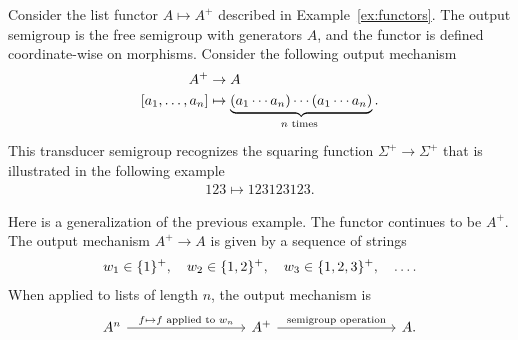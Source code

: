 \begin{myexample}\label{ex:squaring}
    Consider the list functor $A \mapsto A^+$ described in Example~\ref{ex:functors}. The output semigroup is the free semigroup with generators $A$, and the functor is defined coordinate-wise on morphisms. Consider the following output mechanism 
    \begin{align*}
    A^+ & \to A\\
    [a_1,\ldots,a_n] & \mapsto \myunderbrace{(a_1 \cdots a_n) \cdots (a_1 \cdots a_n)}{$n$ times}.
    \end{align*}
    This transducer semigroup recognizes the squaring function $\Sigma^+ \to \Sigma^+$ that is illustrated in the following example 
    \begin{align*}
    123 \mapsto 123123123.
    \end{align*}
\end{myexample}

\begin{myexample}\label{ex:squaring-generalized}
    Here is a generalization of the previous example. The functor continues to be $A^+$. The output mechanism $A^+ \to A$ is given by a sequence of strings 
    \begin{align*}
    w_1 \in \{1\}^+, \quad w_2 \in \{1,2\}^+, \quad w_3 \in \{1,2,3\}^+, \quad \ldots.
    \end{align*}
    When applied to lists of  length $n$, the output mechanism is
    \[
        \begin{tikzcd}
            [column  sep=3cm]
        A^n
        \ar[r,"f \mapsto \text{$f$ applied to $w_n$}"]
        &
        A^+ 
        \ar[r,"\text{semigroup operation}"]
        & 
        A.
        \end{tikzcd}
        \]
\end{myexample}


